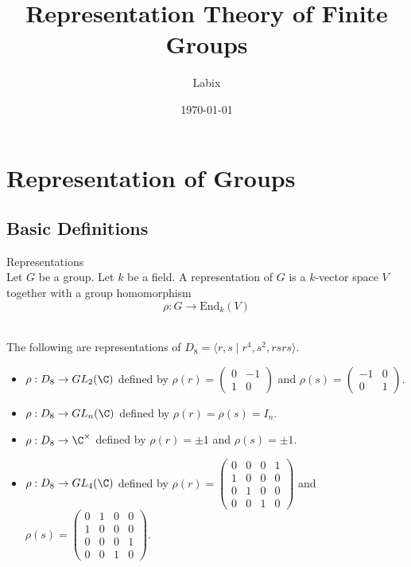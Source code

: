 \documentclass[a4paper]{article}
\title{Representation Theory of Finite Groups}
\author{Labix}
\date{\today}
\begin{document}
\maketitle
\begin{abstract}
\end{abstract}
\pagebreak
\tableofcontents
\pagebreak
\section{Representation of Groups}
\subsection{Basic Definitions}
\begin{defn}{Representations}{}\\
Let $G$ be a group. Let $k$ be a field. A representation of $G$ is a $k$-vector space $V$ together with a group homomorphism $$\rho:G\to\text{End}_k(V)$$
\end{defn}

\begin{eg}{}{}\\
The following are representations of $D_8=\langle r,s\;|\;r^4,s^2,rsrs\rangle$. 
\begin{itemize}
\item $\rho:D_8\to GL_2(\C)$ defined by $\rho(r)=\begin{pmatrix}
0 & -1\\
1 & 0
\end{pmatrix}$ and $\rho(s)=\begin{pmatrix}
-1 & 0\\
0 & 1
\end{pmatrix}$. 
\item $\rho:D_8\to GL_n(\C)$ defined by $\rho(r)=\rho(s)=I_n$. 
\item $\rho:D_8\to\C^\times$ defined by $\rho(r)=\pm1$ and $\rho(s)=\pm1$. 
\item $\rho:D_8\to GL_4(\C)$ defined by $\rho(r)=\begin{pmatrix}
0 & 0 & 0 & 1\\
1 & 0 & 0 & 0\\
0 & 1 & 0 & 0\\
0 & 0 & 1 & 0
\end{pmatrix}$ and $\rho(s)=\begin{pmatrix}
0 & 1 & 0 & 0\\
1 & 0 & 0 & 0\\
0 & 0 & 0 & 1\\
0 & 0 & 1 & 0
\end{pmatrix}$. 
\end{itemize}
\end{eg}
\end{document}
